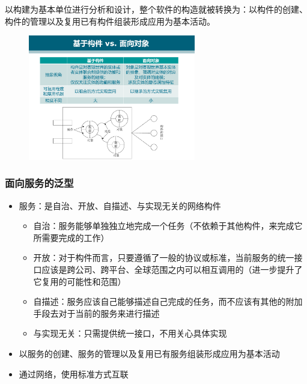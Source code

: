 以构建为基本单位进行分析和设计，整个软件的构造就被转换为：以构件的创建、构件的管理以及复用已有构件组装形成应用为基本活动。

\begin{spacing}{1}
    
\end{spacing}

\begin{figure}[H]
    \vspace{-0.5em}
	\centering
	\includegraphics[width=0.65\textwidth]{images/基于构件与面向对象.pdf}
    \vspace{-1em}
\end{figure}

\subsubsection{面向服务的泛型}
\begin{itemize}
    \item 服务：是自治、开放、自描述、与实现无关的网络构件
    \begin{itemize}
        \item 自治：服务能够单独独立地完成一个任务（不依赖于其他构件，来完成它所需要完成的工作）
        \item 开放：对于构件而言，只要遵循了一般的协议或标准，当前服务的统一接口应该是跨公司、跨平台、全球范围之内可以相互调用的（进一步提升了它复用的可能性和范围）
        \item 自描述：服务应该自己能够描述自己完成的任务，而不应该有其他的附加手段去对于当前的服务来进行描述
        \item 与实现无关：只需提供统一接口，不用关心具体实现
    \end{itemize}
    \item 以服务的创建、服务的管理以及复用已有服务组装形成应用为基本活动
    \item 通过网络，使用标准方式互联
\end{itemize}

